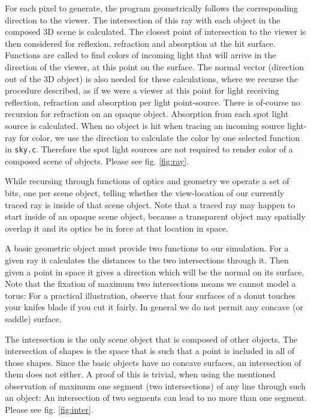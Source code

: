 \documentclass{article}
\begin{document}
For each pixel to generate, the program geometrically follows
the corresponding direction to the viewer.
The intersection of this ray with each object in the composed 3D scene
is calculated.
The closest point of intersection to the viewer is then
considered for reflexion, refraction and absorption at the hit surface.
Functions are called to find colors of incoming light that will
arrive in the direction of the viewer, at this point on the surface.
The normal vector (direction out of the 3D object) is also needed for
these calculations, where we recurse the procedure described, as if
we were a viewer at this point for light receiving reflection,
refraction and absorption per light point-source.  There is of-course
no recursion for refraction on an opaque object.  Absorption from
each spot light source is calculated.  When
no object is hit when tracing an incoming source light-ray for color,
we use the direction to calculate the color by one selected function
in \texttt{sky.c}.  Therefore the spot light sources
are not required to render color of a composed scene of objects.
Please see fig. \ref{fig:ray}.

While recursing through functions of optics and geometry
we operate a set of bits,
one per scene object, telling whether the view-location of our
currently traced ray is inside of that scene object.
Note that a traced ray may happen to start inside
of an opaque scene object,
because a transparent object may spatially overlap it
and its optics be in force at that location in space.

A basic geometric object must provide two functions
to our simulation.
For a given ray it calculates the distances to the
two intersections through it.  Then given a point
in space it gives a direction which will be the normal on its
surface.  Note that the fixation of maximum two intersections
means we cannot model a torus:
For a practical illustration, observe that four surfaces
of a donut touches your knifes blade if you cut it fairly.
In general we do not permit any concave (or saddle) surface.

The intersection is the only scene object that is composed
of other objects.  The intersection of shapes is the space
that is such that a point is included in all of those shapes.
Since the basic objects have no concave surfaces,
an intersection of them does not either.  A proof of this
is trivial, when using the mentioned observation of maximum
one segment (two intersections) of any line through such
an object:  An intersection of two segments can lead to no
more than one segment.
Please see fig. \ref{fig:inter}.
\end{document}
